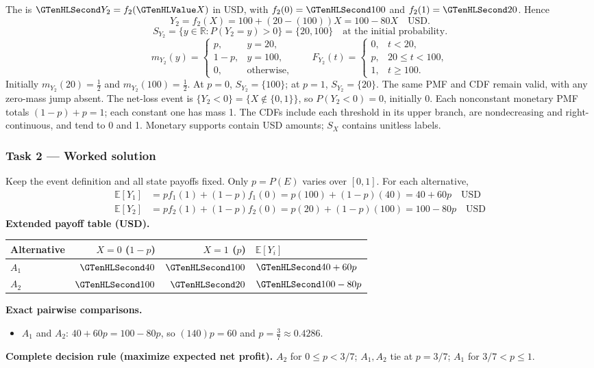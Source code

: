 The  is $\Money{Y_2}=f_2(\Indicator{X})$ in USD, with $f_2(0)=\Money{100}$ and $f_2(1)=\Money{20}$. Hence
\[Y_2=f_2(X)=100+(20-(100))X=100-80X\quad\text{USD}.\]
\[S_{Y_2}=\{y\in\mathbb R:P(Y_2=y)>0\}=\{20,100\}\quad\text{at the initial probability}.\]
\[m_{Y_2}(y)=\begin{cases}p,&y=20,\\1-p,&y=100,\\0,&\text{otherwise},\end{cases}\qquad F_{Y_2}(t)=\begin{cases}0,&t<20,\\p,&20\leq t<100,\\1,&t\geq 100.\end{cases}\]
Initially $m_{Y_2}(20)=\frac{1}{2}$ and $m_{Y_2}(100)=\frac{1}{2}$. At $p=0$, $S_{Y_2}=\{100\}$; at $p=1$, $S_{Y_2}=\{20\}$. The same PMF and CDF remain valid, with any zero-mass jump absent.
The net-loss event is $\{Y_2<0\}=\{X\notin\{0,1\}\}$, so $P(Y_2<0)=0$, initially $0$.
Each nonconstant monetary PMF totals $(1-p)+p=1$; each constant one has mass 1. The CDFs include each threshold in its upper branch, are nondecreasing and right-continuous, and tend to 0 and 1. Monetary supports contain USD amounts; $S_X$ contains unitless labels.
\clearpage\subsubsection*{Task 2 --- Worked solution}\label{sol:c3-coffee-decision}
Keep the event definition and all state payoffs fixed. Only $p=P(E)$ varies over $[0,1]$. For each alternative,
\begin{align*}
\mathbb E[Y_1]&=p f_1(1)+(1-p)f_1(0)=p(100)+(1-p)(40)=40+60p\quad\text{USD}\\
\mathbb E[Y_2]&=p f_2(1)+(1-p)f_2(0)=p(20)+(1-p)(100)=100-80p\quad\text{USD}
\end{align*}
\textbf{Extended payoff table (USD).}\begin{center}\begin{tabular}{lrrl}\toprule Alternative & $X=0$ ($1-p$) & $X=1$ ($p$) & $\mathbb E[Y_i]$\\\midrule
$A_1$ & $\Money{40}$ & $\Money{100}$ & $\Money{40+60p}$\\
$A_2$ & $\Money{100}$ & $\Money{20}$ & $\Money{100-80p}$\\
\bottomrule\end{tabular}\end{center}
\textbf{Exact pairwise comparisons.}\begin{itemize}
\item $A_1$ and $A_2$: $40+60p=100-80p$, so $(140)p=60$ and $p=\frac{3}{7}\approx 0.4286$.
\end{itemize}
\textbf{Complete decision rule (maximize expected net profit).} $A_2$ for $0\leq p<3/7$; $A_1,A_2$ tie at $p=3/7$; $A_1$ for $3/7<p\leq1$.

